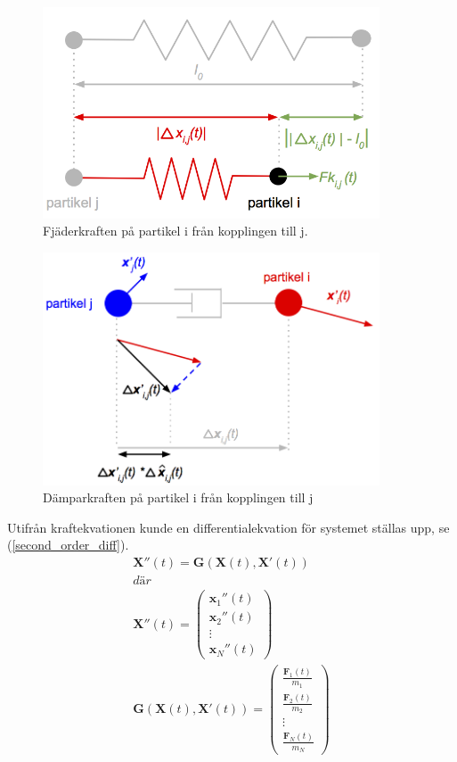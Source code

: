 \documentclass[a4paper,12pt,oneside,final,swedish]{extarticle}
\begin{document}
\begin{figure}[h!]
  \begin{center}
    \includegraphics[width=10cm]{Bilder/Hookes.png} 
  \end{center}
  \caption{Fjäderkraften på partikel i från kopplingen till j.}
  \label{Hookes_image::nonfloat}
\end{figure}
\begin{figure}[h!]
  \begin{center}
    \includegraphics[width=10cm]{Bilder/damper.png} 
  \end{center}
  \caption{Dämparkraften på partikel i från kopplingen till j}
  \label{damper_image::nonfloat}
\end{figure}
Utifrån kraftekvationen kunde en differentialekvation för systemet ställas upp, se (\ref{second_order_diff}).
\begin{equation}
\begin{split}
\mathbf X''(t)=\mathbf G(\mathbf X(t),\mathbf X'(t))\\ där\\ \mathbf X''(t)=\begin{pmatrix} \mathbf{ x }_{ 1 }''(t)
\\ \mathbf{ x }_{ 2 }''(t)
\\ \vdots 
\\ \mathbf{ x }_{ N }''(t) \end{pmatrix}
\\ \mathbf G(\mathbf X(t),\mathbf X'(t))=\begin{pmatrix} \frac { \mathbf{ F }_{ 1 }(t) }{ { m }_{ 1 } } 
\\ \frac { \mathbf{ F }_{ 2 }(t) }{ { m }_{ 2 } }
\\ \vdots 
\\ \frac { \mathbf{ F }_{ N }(t) }{ { m }_{ N } }  \end{pmatrix}
\end{split}
\label{second_order_diff}
\end{equation}
\end{document}
